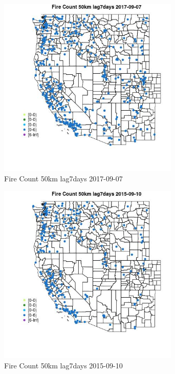 \begin{figure} 
\centering  
\includegraphics[width=0.77\textwidth]{Code_Outputs/Report_ML_input_PM25_Step4_part_e_de_duplicated_aves_compiled_2019-05-20wNAs_MapObsFire_Count_50km_lag7days2017-09-07.jpg} 
\caption{\label{fig:Report_ML_input_PM25_Step4_part_e_de_duplicated_aves_compiled_2019-05-20wNAsMapObsFire_Count_50km_lag7days2017-09-07}Fire Count 50km lag7days 2017-09-07} 
\end{figure} 
 

\begin{figure} 
\centering  
\includegraphics[width=0.77\textwidth]{Code_Outputs/Report_ML_input_PM25_Step4_part_e_de_duplicated_aves_compiled_2019-05-20wNAs_MapObsFire_Count_50km_lag7days2015-09-10.jpg} 
\caption{\label{fig:Report_ML_input_PM25_Step4_part_e_de_duplicated_aves_compiled_2019-05-20wNAsMapObsFire_Count_50km_lag7days2015-09-10}Fire Count 50km lag7days 2015-09-10} 
\end{figure} 
 

